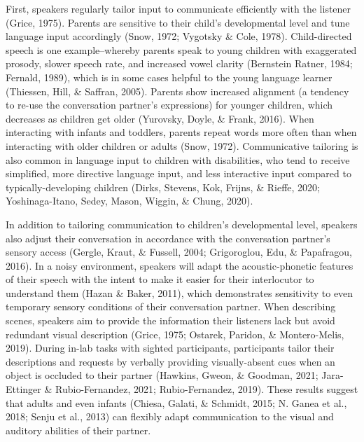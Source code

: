 \documentclass[
  man,floatsintext]{apa6}
\begin{document}
First, speakers regularly tailor input to communicate efficiently with the listener (Grice, 1975). Parents are sensitive to their child's developmental level and tune language input accordingly (Snow, 1972; Vygotsky \& Cole, 1978). Child-directed speech is one example--whereby parents speak to young children with exaggerated prosody, slower speech rate, and increased vowel clarity (Bernstein Ratner, 1984; Fernald, 1989), which is in some cases helpful to the young language learner (Thiessen, Hill, \& Saffran, 2005). Parents show increased alignment (a tendency to re-use the conversation partner's expressions) for younger children, which decreases as children get older (Yurovsky, Doyle, \& Frank, 2016). When interacting with infants and toddlers, parents repeat words more often than when interacting with older children or adults (Snow, 1972). Communicative tailoring is also common in language input to children with disabilities, who tend to receive simplified, more directive language input, and less interactive input compared to typically-developing children (Dirks, Stevens, Kok, Frijns, \& Rieffe, 2020; Yoshinaga-Itano, Sedey, Mason, Wiggin, \& Chung, 2020).

In addition to tailoring communication to children's developmental level, speakers also adjust their conversation in accordance with the conversation partner's sensory access (Gergle, Kraut, \& Fussell, 2004; Grigoroglou, Edu, \& Papafragou, 2016). In a noisy environment, speakers will adapt the acoustic-phonetic features of their speech with the intent to make it easier for their interlocutor to understand them (Hazan \& Baker, 2011), which demonstrates sensitivity to even temporary sensory conditions of their conversation partner. When describing scenes, speakers aim to provide the information their listeners lack but avoid redundant visual description (Grice, 1975; Ostarek, Paridon, \& Montero-Melis, 2019). During in-lab tasks with sighted participants, participants tailor their descriptions and requests by verbally providing visually-absent cues when an object is occluded to their partner (Hawkins, Gweon, \& Goodman, 2021; Jara-Ettinger \& Rubio-Fernandez, 2021; Rubio-Fernandez, 2019). These results suggest that adults and even infants (Chiesa, Galati, \& Schmidt, 2015; N. Ganea et al., 2018; Senju et al., 2013) can flexibly adapt communication to the visual and auditory abilities of their partner.
\end{document}
